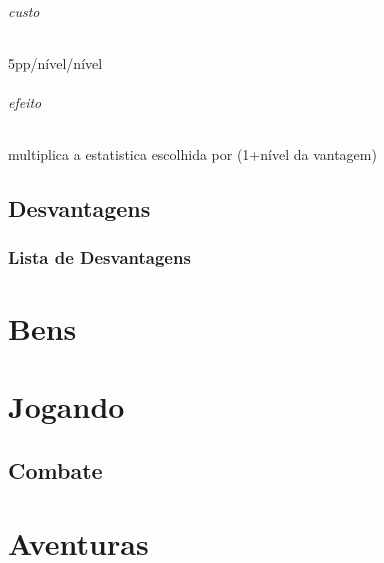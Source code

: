 \paragraph{custo} 5pp/nível/nível
\paragraph{efeito} multiplica a estatistica escolhida por (1+nível da vantagem)
%
%
%
%
\chapter{Desvantagens}
\section{Lista de Desvantagens}
%
%
%
%
%
%
%
\part{Bens}
%
%
%
%
\part{Jogando}
\chapter{Combate}
%
%
%
%
\part{Aventuras}
\chapter{}
